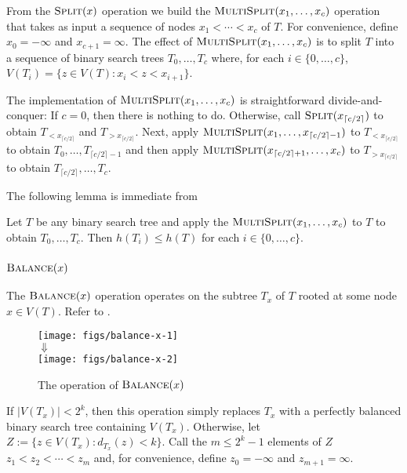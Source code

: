 \documentclass[kpfonts]{patmorin}
\let\le\leqslant
\begin{document}
From the $\textsc{Split}(x)$ operation we build the $\textsc{MultiSplit}(x_1,\ldots,x_c)$ operation that takes as input a sequence of nodes $x_1<\cdots<x_c$ of $T$.  For convenience, define $x_0=-\infty$ and $x_{c+1}=\infty$.  The effect of $\textsc{MultiSplit}(x_1,\ldots,x_c)$ is to split $T$ into a sequence of binary search trees $T_0,\ldots,T_{c}$ where, for each $i\in\{0,\ldots,c\}$, $V(T_i)=\{z\in V(T): x_i< z<x_{i+1}\}$.

The implementation of $\textsc{MultiSplit}(x_1,\ldots,x_c)$ is straightforward divide-and-conquer:  If $c=0$, then there is nothing to do.  Otherwise, call $\textsc{Split}(x_{\lceil c/2\rceil})$ to obtain $T_{<x_{\lceil c/2\rceil}}$ and $T_{>x_{\lceil c/2\rceil}}$.  Next, apply $\textsc{MultiSplit}(x_1,\ldots,x_{\lceil c/2\rceil-1})$ to $T_{<x_{\lceil c/2\rceil}}$ to obtain $T_0,\ldots,T_{\lceil c/2\rceil-1}$ and then apply $\textsc{MultiSplit}(x_{\lceil c/2\rceil+1},\ldots,x_c)$ to $T_{>x_{\lceil c/2\rceil}}$ to obtain $T_{\lceil c/2\rceil},\ldots,T_c$.

The following lemma is immediate from  
\begin{lem}
  Let $T$ be any binary search tree and apply the $\textsc{MultiSplit}(x_1,\ldots,x_c)$ to $T$ to obtain $T_0,\ldots,T_c$.  Then $h(T_i)\le h(T)$ for each $i\in\{0,\ldots,c\}$.
\end{lem}

\subsubsection{$\textsc{Balance}(x)$}

The $\textsc{Balance}(x)$ operation operates on the subtree $T_x$ of $T$ rooted at some node $x\in V(T)$.   Refer to .

\begin{figure}
    \begin{center}
      \texttt{[image: figs/balance-x-1]} \\[-2ex]
      $\Downarrow$ \\[1ex]
      \texttt{[image: figs/balance-x-2]}
    \end{center}  
  \caption{The operation of $\textsc{Balance}(x)$}
\end{figure}

If $|V(T_x)|< 2^k$, then this operation simply replaces $T_x$ with a perfectly balanced binary search tree containing $V(T_x)$.  Otherwise, let $Z:=\{z\in V(T_x): d_{T_x}(z)< k\}$.  Call the $m\le 2^k-1$ elements of $Z$  $z_1<z_2<\cdots<z_{m}$ and, for convenience, define $z_0=-\infty$ and $z_{m+1}=\infty$.
\end{document}
